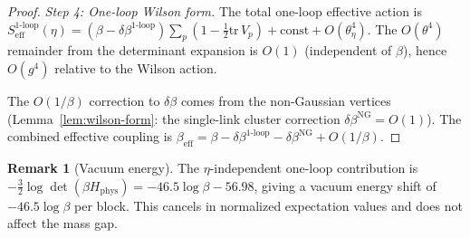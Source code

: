 \documentclass[11pt]{article}
\theoremstyle{definition}
\newtheorem{remark}[theorem]{Remark}
\newcommand{\tr}{\mathrm{tr}}
\begin{document}
\begin{proof}
\emph{Step 4: One-loop Wilson form.}
The total one-loop effective action is
$S_{\mathrm{eff}}^{1\text{-loop}}(\eta)
=(\beta-\delta\beta^{1\text{-loop}})\sum_p
(1-\frac{1}{2}\tr\,V_p)+\mathrm{const}+O(\theta_\eta^4)$.
The $O(\theta^4)$ remainder from the determinant expansion
is $O(1)$ (independent of $\beta$), hence $O(g^4)$ relative
to the Wilson action.

The $O(1/\beta)$ correction to $\delta\beta$ comes from the
non-Gaussian vertices (Lemma~\ref{lem:wilson-form}:
the single-link cluster correction $\delta\beta^{\mathrm{NG}}
=O(1)$).  The combined effective coupling is
$\beta_{\mathrm{eff}}
=\beta-\delta\beta^{1\text{-loop}}-\delta\beta^{\mathrm{NG}}
+O(1/\beta)$.
\end{proof}

\begin{remark}[Vacuum energy]
The $\eta$-independent one-loop contribution is
$-\frac{3}{2}\log\det(\beta H_{\mathrm{phys}})
=-46.5\log\beta-56.98$, giving a vacuum energy shift of
$-46.5\log\beta$ per block.  This cancels in normalized expectation
values and does not affect the mass gap.
\end{remark}
\end{document}
